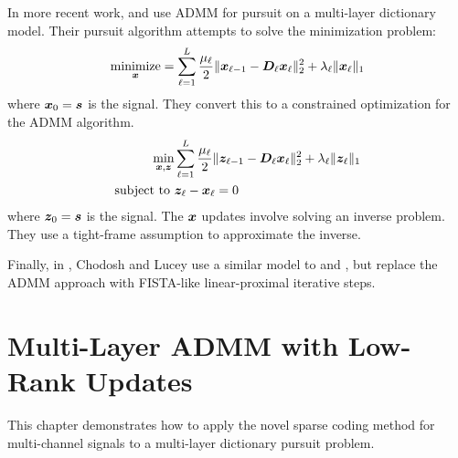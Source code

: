 In more recent work, \cite{murdock2018deep} and \cite{chodosh2018deep} use ADMM for pursuit on a multi-layer dictionary model. Their pursuit algorithm attempts to solve the minimization problem:
\begin{equation}
\operatorname*{\text{minimize}}_{\bm{x}} = \sum_{\ell = 1}^{L} \frac{\mu_{\ell}}{2}\|\bm{x}_{\ell - 1} -\bm{D}_{\ell}\bm{x}_{\ell}\|_2^2 + \lambda_{\ell}\|\bm{x}_{\ell}\|_1
\end{equation}
where $\bm{x}_0 = \bm{s}$ is the signal. They convert this to a constrained optimization for the ADMM algorithm.
\begin{equation}
\begin{aligned}
\min_{\bm{x},\bm{z}} & \sum_{\ell = 1}^{L} \frac{\mu_{\ell}}{2}\|\bm{z}_{\ell - 1} -\bm{D}_{\ell}\bm{x}_{\ell}\|_2^2 + \lambda_{\ell}\|\bm{z}_{\ell}\|_1 \\
\text{subject to } & \bm{z}_{\ell} - \bm{x}_{\ell} = 0
\end{aligned} \label{equation:ADMM Multi-Layer Pursuit Objective}
\end{equation}
where $\bm{z}_0 = \bm{s}$ is the signal. The $\bm{x}$ updates involve solving an inverse problem. They use a tight-frame assumption to approximate the inverse.

Finally, in \cite{chodosh2020use}, Chodosh and Lucey use a similar model to \cite{murdock2018deep} and \cite{chodosh2018deep}, but replace the ADMM approach with FISTA-like linear-proximal iterative steps.

\section{Multi-Layer ADMM with Low-Rank Updates}
This chapter demonstrates how to apply the novel sparse coding method for multi-channel signals to a multi-layer dictionary pursuit problem.

